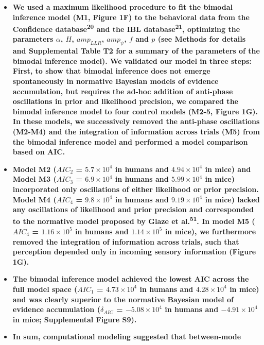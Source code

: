 \documentclass[
]{article}
\begin{document}
\begin{itemize}
\item
  \textbf{We used a maximum likelihood procedure to fit the bimodal
  inference model (M1, Figure 1F) to the behavioral data from the
  Confidence database\textsuperscript{20} and the IBL
  database\textsuperscript{21}, optimizing the parameters \(\alpha\),
  \(H\), \(amp_{LLR}\), \(amp_{\psi}\), \(f\) and \(p\) (see Methods for
  details and Supplemental Table T2 for a summary of the parameters of
  the bimodal inference model). We validated our model in three steps:
  First, to show that bimodal inference does not emerge spontaneously in
  normative Bayesian models of evidence accumulation, but requires the
  ad-hoc addition of anti-phase oscillations in prior and likelihood
  precision, we compared the bimodal inference model to four control
  models (M2-5, Figure 1G). In these models, we successively removed the
  anti-phase oscillations (M2-M4) and the integration of information
  across trials (M5) from the bimodal inference model and performed a
  model comparison based on AIC.}
\item
  \textbf{Model M2 (\(AIC_2\) = \(\ensuremath{5.7\times 10^{4}}\) in
  humans and \(\ensuremath{4.94\times 10^{4}}\) in mice) and Model M3
  (\(AIC_3\) = \(\ensuremath{6.9\times 10^{4}}\) in humans and
  \(\ensuremath{5.99\times 10^{4}}\) in mice) incorporated only
  oscillations of either likelihood or prior precision. Model M4
  (\(AIC_4\) = \(\ensuremath{9.8\times 10^{4}}\) in humans and
  \(\ensuremath{9.19\times 10^{4}}\) in mice) lacked any oscillations of
  likelihood and prior precision and corresponded to the normative model
  proposed by Glaze et al.\textsuperscript{51}. In model M5 (\(AIC_4\) =
  \(\ensuremath{1.16\times 10^{5}}\) in humans and
  \(\ensuremath{1.14\times 10^{5}}\) in mice), we furthermore removed
  the integration of information across trials, such that perception
  depended only in incoming sensory information (Figure 1G).}
\item
  \textbf{The bimodal inference model achieved the lowest AIC across the
  full model space (\(AIC_1\) = \(\ensuremath{4.73\times 10^{4}}\) in
  humans and \(\ensuremath{4.28\times 10^{4}}\) in mice) and was clearly
  superior to the normative Bayesian model of evidence accumulation
  (\(\delta_{AIC}\) = \(\ensuremath{-5.08\times 10^{4}}\) in humans and
  \(\ensuremath{-4.91\times 10^{4}}\) in mice; Supplemental Figure S9).}
\item
  \textbf{In sum, computational modeling suggested that between-mode
}
\end{itemize}
\end{document}
